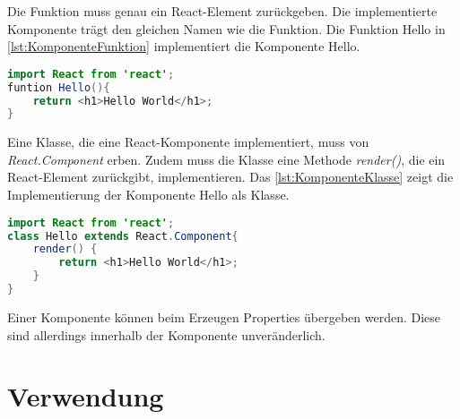 Die Funktion muss genau ein React-Element zurückgeben. Die implementierte Komponente trägt den gleichen Namen wie die Funktion. Die Funktion Hello in \autoref{lst:KomponenteFunktion} implementiert die Komponente Hello.

\begin{lstlisting}[caption=Beispiel einer Komponente als Funktion, label=lst:KomponenteFunktion, language=Java]
import React from 'react';
funtion Hello(){
	return <h1>Hello World</h1>;
}
\end{lstlisting}

Eine Klasse, die eine React-Komponente implementiert, muss von \textit{React.Component} erben. Zudem muss die Klasse eine Methode \textit{render()}, die ein React-Element zurückgibt, implementieren. Das \autoref{lst:KomponenteKlasse} zeigt die Implementierung der Komponente Hello als Klasse.

\begin{lstlisting}[caption=Beispiel einer Komponente als Klasse, label=lst:KomponenteKlasse, language=Java]
import React from 'react';
class Hello extends React.Component{
	render() {
		return <h1>Hello World</h1>;
	}
}
\end{lstlisting}


Einer Komponente können beim Erzeugen Properties übergeben werden. Diese sind allerdings innerhalb der Komponente unveränderlich.\autocites[vgl.][71\psqq]{Zeigermann.2016}[vgl.][11\psqq]{Stefanov.2017}



  

\section{Verwendung}


